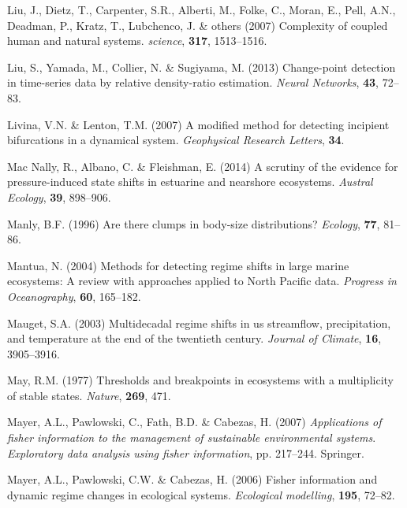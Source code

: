 \documentclass[print]{nuthesis}
\begin{document}
\leavevmode\hypertarget{ref-liu_complexity_2007}{}%
Liu, J., Dietz, T., Carpenter, S.R., Alberti, M., Folke, C., Moran, E., Pell, A.N., Deadman, P., Kratz, T., Lubchenco, J. \& others (2007) Complexity of coupled human and natural systems. \emph{science}, \textbf{317}, 1513--1516.

\leavevmode\hypertarget{ref-liu2013change}{}%
Liu, S., Yamada, M., Collier, N. \& Sugiyama, M. (2013) Change-point detection in time-series data by relative density-ratio estimation. \emph{Neural Networks}, \textbf{43}, 72--83.

\leavevmode\hypertarget{ref-livina2007modified}{}%
Livina, V.N. \& Lenton, T.M. (2007) A modified method for detecting incipient bifurcations in a dynamical system. \emph{Geophysical Research Letters}, \textbf{34}.

\leavevmode\hypertarget{ref-mac2014scrutiny}{}%
Mac Nally, R., Albano, C. \& Fleishman, E. (2014) A scrutiny of the evidence for pressure-induced state shifts in estuarine and nearshore ecosystems. \emph{Austral Ecology}, \textbf{39}, 898--906.

\leavevmode\hypertarget{ref-manly1996there}{}%
Manly, B.F. (1996) Are there clumps in body-size distributions? \emph{Ecology}, \textbf{77}, 81--86.

\leavevmode\hypertarget{ref-mantua_methods_2004}{}%
Mantua, N. (2004) Methods for detecting regime shifts in large marine ecosystems: A review with approaches applied to North Pacific data. \emph{Progress in Oceanography}, \textbf{60}, 165--182.

\leavevmode\hypertarget{ref-mauget2003multidecadal}{}%
Mauget, S.A. (2003) Multidecadal regime shifts in us streamflow, precipitation, and temperature at the end of the twentieth century. \emph{Journal of Climate}, \textbf{16}, 3905--3916.

\leavevmode\hypertarget{ref-may1977thresholds}{}%
May, R.M. (1977) Thresholds and breakpoints in ecosystems with a multiplicity of stable states. \emph{Nature}, \textbf{269}, 471.

\leavevmode\hypertarget{ref-mayer_applications_2007}{}%
Mayer, A.L., Pawlowski, C., Fath, B.D. \& Cabezas, H. (2007) \emph{Applications of fisher information to the management of sustainable environmental systems}. \emph{Exploratory data analysis using fisher information}, pp. 217--244. Springer.

\leavevmode\hypertarget{ref-mayer_fisher_2006}{}%
Mayer, A.L., Pawlowski, C.W. \& Cabezas, H. (2006) Fisher information and dynamic regime changes in ecological systems. \emph{Ecological modelling}, \textbf{195}, 72--82.
\end{document}

